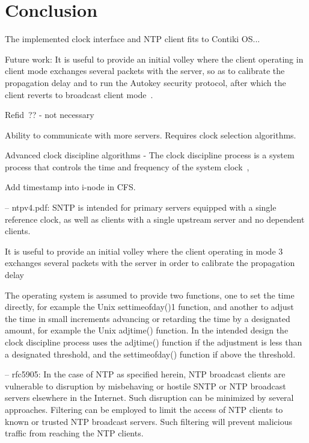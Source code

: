 



\chapter{Conclusion}
The implemented clock interface and NTP client fits to Contiki OS...

Future work:
It is useful to provide an initial volley where the client operating in
client mode exchanges several packets with the server, so as to
calibrate the propagation delay and to run the Autokey security
protocol, after which the client reverts to broadcast client mode~\cite{rfc5905}.

Refid~\cite{rfc5905}?? - not necessary

Ability to communicate with more servers. Requires clock selection algorithms.

Advanced clock discipline algorithms -
The clock discipline process is a system process that controls the
time and frequency of the system clock~\cite{rfc5905},

Add timestamp into i-node in CFS.

--
ntpv4.pdf:
SNTP is intended for primary
servers equipped with a single reference clock, as well as clients with a single upstream server
and no dependent clients.

It is useful to provide an
initial volley where the client operating in mode 3 exchanges several packets with the server in
order to calibrate the propagation delay

The operating system is assumed to provide two functions, one to set the time
directly, for example the Unix settimeofday()1 function, and another to adjust the time in small
increments advancing or retarding the time by a designated amount, for example the Unix
adjtime() function. In the intended design the clock discipline process uses the adjtime() function
if the adjustment is less than a designated threshold, and the settimeofday() function if above the
threshold.


--
rfc5905:
In the case of NTP as specified herein, NTP broadcast clients are
vulnerable to disruption by misbehaving or hostile SNTP or NTP
broadcast servers elsewhere in the Internet.  Such disruption can be
minimized by several approaches.  Filtering can be employed to limit
the access of NTP clients to known or trusted NTP broadcast servers.
Such filtering will prevent malicious traffic from reaching the NTP
clients.
